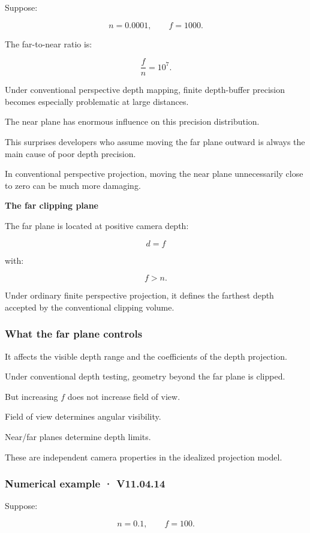 Suppose:

\[
 n=0.0001, \qquad f=1000.
\]

The far-to-near ratio is:

\[
 \frac fn=10^7.
\]

Under conventional perspective depth mapping, finite depth-buffer precision becomes especially problematic at large distances.

The near plane has enormous influence on this precision distribution.

This surprises developers who assume moving the far plane outward is always the main cause of poor depth precision.

In conventional perspective projection, moving the near plane unnecessarily close to zero can be much more damaging.

\textbf{The far clipping plane}

The far plane is located at positive camera depth:

\[
 \boxed{d=f}
\]

with:

\[
 f>n.
\]

Under ordinary finite perspective projection, it defines the farthest depth accepted by the conventional clipping volume.

\subsubsection{What the far plane controls}\label{what-the-far-plane-controls}

It affects the visible depth range and the coefficients of the depth projection.

Under conventional depth testing, geometry beyond the far plane is clipped.

But increasing \(f\) does not increase field of view.

Field of view determines angular visibility.

Near/far planes determine depth limits.

These are independent camera properties in the idealized projection model.

\subsubsection{Numerical example · V11.04.14}\label{numerical-example-v11.04.14}

Suppose:

\[
 n=0.1,\qquad f=100.
\]


